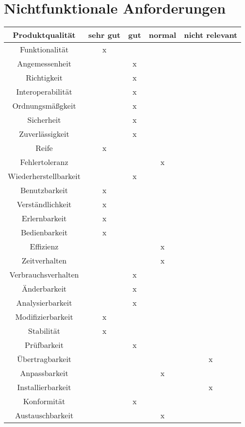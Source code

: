 
\chapter{Nichtfunktionale Anforderungen}


\begin{tabular}{|c|c|c|c|c|}
  \hline                                              %

  \textbf{Produktqualität}  & \textbf{sehr gut}  &    \textbf{gut}  &
  \textbf{normal}           & \textbf{nicht relevant}  \\  %
  \hline                                              %

Funktionalität  &x&&&\\        %
  \hline
Angemessenheit&&x&&\\
\hline
Richtigkeit&&x&&\\
\hline
Interoperabilität&&x&&\\
\hline
Ordnungsmäßgkeit&&x&&\\
\hline
Sicherheit&&x&&\\
\hline
Zuverlässigkeit&&x&&\\
\hline
Reife&x&&&\\
\hline
Fehlertoleranz&&&x&\\
\hline
Wiederherstellbarkeit&&x&&\\
\hline
Benutzbarkeit&x&&&\\
\hline
Verständlichkeit&x&&&\\
\hline
Erlernbarkeit&x&&&\\
\hline
Bedienbarkeit&x&&&\\
\hline
Effizienz&&&x&\\
\hline
Zeitverhalten&&&x&\\
\hline
Verbrauchsverhalten&&x&&\\
\hline
Änderbarkeit&&x&&\\
\hline
Analysierbarkeit&&x&&\\
\hline
Modifizierbarkeit&x&&&\\
\hline
Stabilität&x&&&\\
\hline
Prüfbarkeit&&x&&\\
\hline
Übertragbarkeit&&&&x\\
\hline
Anpassbarkeit&&&x&\\
\hline
Installierbarkeit&&&&x\\
\hline
Konformität&&x&&\\
\hline
Austauschbarkeit&&&x&\\
\hline
\end{tabular}


